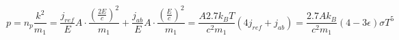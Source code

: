 \documentclass[\main/master.tex]{subfiles}
\begin{document}
\begin{equation}
p =  n_p\frac{ k^2}{m_1} = \frac{j_{ref}}{E}A\cdot\frac{ (\frac{2E}{c})^2}{m_1} +\frac{j_{ab}}{E}A\cdot\frac{ (\frac{E}{c})^2}{m_1} = \frac{ A 2.7 k_B T}{ c^2 m_1} (4j_{ref}+j_{ab}) =\frac{2.7A k_B}{ c^2 m_1} (4-3\epsilon)\sigma T^5 
\label{eqn:photon collision power}
\end{equation}
\end{document}
